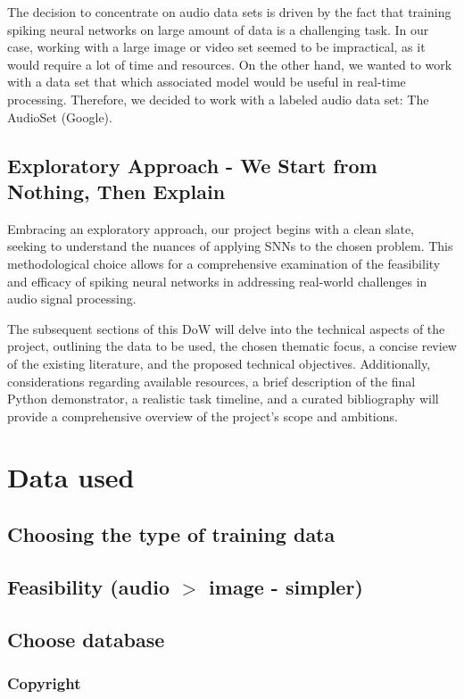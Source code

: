 \documentclass{article}
\begin{document}
The decision to concentrate on audio data sets is driven by the fact that training spiking neural networks on large amount of data is a challenging task. In our case, working with a large image or video set seemed to be impractical, as it would require a lot of time and resources. On the other hand, we wanted to work with a data set that which associated model would be useful in real-time processing. Therefore, we decided to work with a labeled audio data set: The AudioSet (Google).

\subsection{Exploratory Approach - We Start from Nothing, Then Explain}

Embracing an exploratory approach, our project begins with a clean slate, seeking to understand the nuances of applying SNNs to the chosen problem. This methodological choice allows for a comprehensive examination of the feasibility and efficacy of spiking neural networks in addressing real-world challenges in audio signal processing.

The subsequent sections of this DoW will delve into the technical aspects of the project, outlining the data to be used, the chosen thematic focus, a concise review of the existing literature, and the proposed technical objectives. Additionally, considerations regarding available resources, a brief description of the final Python demonstrator, a realistic task timeline, and a curated bibliography will provide a comprehensive overview of the project's scope and ambitions.

\section{Data used}
\subsection{Choosing the type of training data}
\subsection{Feasibility (audio $>$ image - simpler)}
\subsection{Choose database}
\subsubsection{Copyright}
\end{document}
